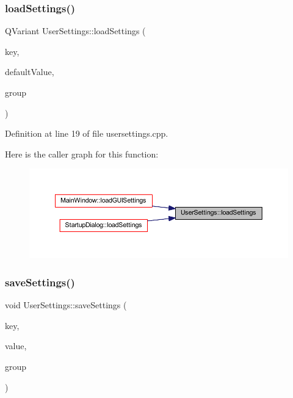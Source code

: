 \subsubsection{\texorpdfstring{loadSettings()}{loadSettings()}}
{\footnotesize\ttfamily Q\+Variant User\+Settings\+::load\+Settings (\begin{DoxyParamCaption}\item[{const Q\+String \&}]{key,  }\item[{const Q\+Variant \&}]{default\+Value,  }\item[{const Q\+String \&}]{group }\end{DoxyParamCaption})\hspace{0.3cm}{\ttfamily [static]}}



Definition at line 19 of file usersettings.\+cpp.

Here is the caller graph for this function\+:
\nopagebreak
\begin{figure}[H]
\begin{center}
\leavevmode
\includegraphics[width=350pt]{class_user_settings_aa58768206ee548c32bf5f89e1ed8c8ba_icgraph}
\end{center}
\end{figure}
\mbox{\label{class_user_settings_a0ec1a38cad81b92041d4024a4862c738}} 
\subsubsection{\texorpdfstring{saveSettings()}{saveSettings()}}
{\footnotesize\ttfamily void User\+Settings\+::save\+Settings (\begin{DoxyParamCaption}\item[{const Q\+String \&}]{key,  }\item[{const Q\+Variant \&}]{value,  }\item[{const Q\+String \&}]{group }\end{DoxyParamCaption})\hspace{0.3cm}{\ttfamily [static]}}



